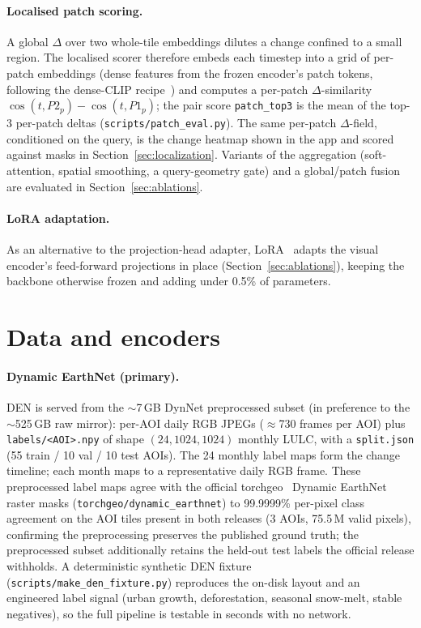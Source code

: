 \documentclass{article}
\begin{document}
\paragraph{Localised patch scoring.}
A global $\Delta$ over two whole-tile embeddings dilutes a change confined to a
small region. The localised scorer therefore embeds each timestep into a grid of
per-patch embeddings (dense features from the frozen encoder's patch tokens,
following the dense-CLIP recipe~\cite{maskclip}) and computes a per-patch
$\Delta$-similarity
$\cos(t, P2_p) - \cos(t, P1_p)$; the pair score \texttt{patch\_top3} is the mean
of the top-3 per-patch deltas (\texttt{scripts/patch\_eval.py}). The same
per-patch $\Delta$-field, conditioned on the query, is the change heatmap shown
in the app and scored against masks in Section~\ref{sec:localization}. Variants
of the aggregation (soft-attention, spatial smoothing, a query-geometry gate) and
a global/patch fusion are evaluated in Section~\ref{sec:ablations}.

\paragraph{LoRA adaptation.}
As an alternative to the projection-head adapter, LoRA~\cite{lora} adapts the
visual encoder's feed-forward projections in place (Section~\ref{sec:ablations}),
keeping the backbone otherwise frozen and adding under 0.5\% of parameters.


\section{Data and encoders}
\label{sec:data}

\paragraph{Dynamic EarthNet (primary).}
DEN is served from the $\sim$7\,GB DynNet preprocessed subset (in preference to
the $\sim$525\,GB raw mirror): per-AOI daily RGB JPEGs ($\approx$730 frames per
AOI) plus \texttt{labels/<AOI>.npy} of shape $(24, 1024, 1024)$ monthly LULC,
with a \texttt{split.json} (55 train / 10 val / 10 test AOIs). The 24 monthly
label maps form the change timeline; each month maps to a representative daily
RGB frame. These preprocessed label maps agree with the official
torchgeo~\cite{torchgeo} Dynamic EarthNet raster masks
(\texttt{torchgeo/dynamic\_earthnet}) to 99.9999\% per-pixel class agreement on
the AOI tiles present in both releases (3 AOIs, 75.5\,M valid pixels),
confirming the preprocessing preserves the published ground truth; the
preprocessed subset additionally retains the held-out test labels the official
release withholds. A deterministic synthetic DEN fixture
(\texttt{scripts/make\_den\_fixture.py}) reproduces the on-disk layout and an
engineered label signal (urban growth, deforestation, seasonal snow-melt, stable
negatives), so the full pipeline is testable in seconds with no network.
\end{document}
